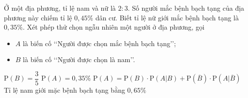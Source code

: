 \begin{ex}%
Ở một địa phương, tỉ lệ nam và nữ là $2 : 3$. Số người mắc bệnh bạch tạng của địa phương này chiếm tỉ lệ $0{,}45\%$ dân cư. Biết tỉ lệ nữ giới mắc bệnh bạch tạng là $0{,}35\%$. Xét phép thử chọn ngẫu nhiên một người ở địa phương, gọi
\begin{itemize}
\item $A$ là biến cố \lq\lq Người được chọn mắc bệnh bạch tạng\rq\rq;
\item $B$ là biến cố \lq\lq Người được chọn là nam\rq\rq.
\end{itemize}
\choiceTF
{ $\mathrm{P}(B)=\dfrac{3}{5}$}
{$\mathrm{P}(A)=0{,}35\%$}
{\True $\mathrm{P}(A) = \mathrm{P}(B)\cdot \mathrm{P}(A|B) + \mathrm{P}\left(\overline{B}\right)\cdot \mathrm{P}\left(A|\overline{B}\right)$}
{\True Tỉ lệ nam giới mặc bệnh bạch tạng bằng $0{,}65\%$}
\end{ex}

